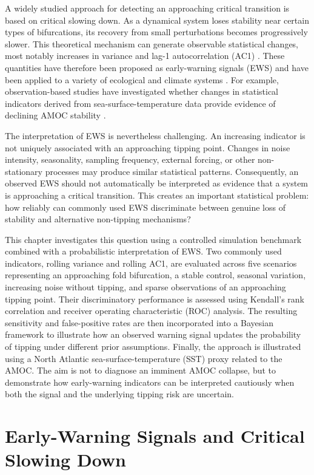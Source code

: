 \documentclass[
]{krantz}
\begin{document}
A widely studied approach for detecting an approaching critical transition is based on critical slowing down. As a dynamical system loses stability near certain types of bifurcations, its recovery from small perturbations becomes progressively slower. This theoretical mechanism can generate observable statistical changes, most notably increases in variance and lag-1 autocorrelation (AC1) \citep{scheffer2009}. These quantities have therefore been proposed as early-warning signals (EWS) and have been applied to a variety of ecological and climate systems \citep{dakos2012}. For example, observation-based studies have investigated whether changes in statistical indicators derived from sea-surface-temperature data provide evidence of declining AMOC stability \citep{boers2021}.

The interpretation of EWS is nevertheless challenging. An increasing indicator is not uniquely associated with an approaching tipping point. Changes in noise intensity, seasonality, sampling frequency, external forcing, or other non-stationary processes may produce similar statistical patterns. Consequently, an observed EWS should not automatically be interpreted as evidence that a system is approaching a critical transition. This creates an important statistical problem: how reliably can commonly used EWS discriminate between genuine loss of stability and alternative non-tipping mechanisms?

This chapter investigates this question using a controlled simulation benchmark combined with a probabilistic interpretation of EWS. Two commonly used indicators, rolling variance and rolling AC1, are evaluated across five scenarios representing an approaching fold bifurcation, a stable control, seasonal variation, increasing noise without tipping, and sparse observations of an approaching tipping point. Their discriminatory performance is assessed using Kendall's rank correlation and receiver operating characteristic (ROC) analysis. The resulting sensitivity and false-positive rates are then incorporated into a Bayesian framework to illustrate how an observed warning signal updates the probability of tipping under different prior assumptions. Finally, the approach is illustrated using a North Atlantic sea-surface-temperature (SST) proxy related to the AMOC. The aim is not to diagnose an imminent AMOC collapse, but to demonstrate how early-warning indicators can be interpreted cautiously when both the signal and the underlying tipping risk are uncertain.

\section{Early-Warning Signals and Critical Slowing Down}\label{early-warning-signals-and-critical-slowing-down}
\end{document}
